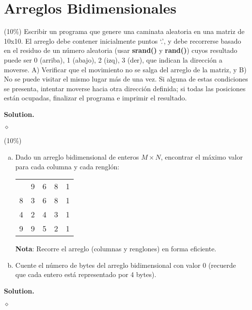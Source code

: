 \documentclass{article}
\theoremstyle{problemstyle}
\newenvironment{solution}{%
  \begin{mdframed}[linewidth=0.8pt,linecolor=Gray,backgroundcolor=Gray!5,roundcorner=5pt, nobreak=true]%
  \noindent\textbf{Solution.}%
}{%
\hfill $ \diamond $ 
  \end{mdframed}%
}
\begin{document}
\section*{Arreglos Bidimensionales}\label{sec:arreglos_bidimensionales} %
\begin{problem}
(10\%) Escribir un programa que genere una caminata aleatoria en una matriz de 10x10. El arreglo debe contener inicialmente puntos `.', y debe recorrerse basado en el residuo de un n\'umero aleatoria (usar \textbf{srand()} y \textbf{rand()}) cuyos resultado puede ser {0 (arriba), 1 (abajo), 2 (izq), 3 (der)}, que indican la direcci\'on a moverse. A) Verificar que el movimiento no se salga del arreglo de la matriz, y B) No se puede visitar el mismo lugar más de una vez. Si alguna de estas condiciones se presenta, intentar moverse hacia otra direcci\'on definida; si todas las posiciones están ocupadas, finalizar el programa e imprimir el resultado.
\end{problem}

\begin{solution}

\end{solution}

\begin{problem}
(10\%)
\begin{enumerate}[a)]
	\item Dado un arreglo bidimensional de enteros $ M\times N $, encontrar el m\'aximo valor para cada columna y cada rengl\'on:
	      \setlength\doublerulesep{0.5pt}
	      \begin{center}
		      \begin{tabular}[c]{|c||c|c|c|c|}
			      \hline
			        & 9 & 6 & 8 & 1 \\
			      \hhline{|=#=|=|=|=|}
			      8 & 3 & 6 & 8 & 1 \\
			      \hline
			      4 & 2 & 4 & 3 & 1 \\
			      \hline
			      9 & 9 & 5 & 2 & 1 \\
			      \hline
		      \end{tabular}
	      \end{center}
	      \textbf{Nota}: Recorre el arreglo (columnas y renglones) en forma eficiente.

	\item Cuente el n\'umero de bytes del arreglo bidimensional con valor 0 (recuerde que cada entero est\'a representado por 4 bytes).
\end{enumerate}

\end{problem}
\begin{solution}

\end{solution}
\end{document}
